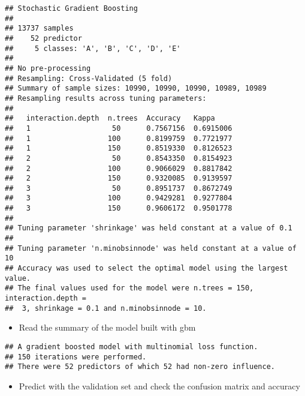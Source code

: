\documentclass[
]{article}
\newenvironment{Shaded}{\begin{snugshade}}{\end{snugshade}}
\newcommand{\AttributeTok}[1]{\textcolor[rgb]{0.13,0.29,0.53}{#1}}
\newcommand{\FunctionTok}[1]{\textcolor[rgb]{0.13,0.29,0.53}{\textbf{#1}}}
\newcommand{\NormalTok}[1]{#1}
\newcommand{\OtherTok}[1]{\textcolor[rgb]{0.56,0.35,0.01}{#1}}
\newcommand{\SpecialCharTok}[1]{\textcolor[rgb]{0.81,0.36,0.00}{\textbf{#1}}}
\providecommand{\tightlist}{%
  \setlength{\itemsep}{0pt}\setlength{\parskip}{0pt}}
\begin{document}
\begin{verbatim}
## Stochastic Gradient Boosting 
## 
## 13737 samples
##    52 predictor
##     5 classes: 'A', 'B', 'C', 'D', 'E' 
## 
## No pre-processing
## Resampling: Cross-Validated (5 fold) 
## Summary of sample sizes: 10990, 10990, 10990, 10989, 10989 
## Resampling results across tuning parameters:
## 
##   interaction.depth  n.trees  Accuracy   Kappa    
##   1                   50      0.7567156  0.6915006
##   1                  100      0.8199759  0.7721977
##   1                  150      0.8519330  0.8126523
##   2                   50      0.8543350  0.8154923
##   2                  100      0.9066029  0.8817842
##   2                  150      0.9320085  0.9139597
##   3                   50      0.8951737  0.8672749
##   3                  100      0.9429281  0.9277804
##   3                  150      0.9606172  0.9501778
## 
## Tuning parameter 'shrinkage' was held constant at a value of 0.1
## 
## Tuning parameter 'n.minobsinnode' was held constant at a value of 10
## Accuracy was used to select the optimal model using the largest value.
## The final values used for the model were n.trees = 150, interaction.depth =
##  3, shrinkage = 0.1 and n.minobsinnode = 10.
\end{verbatim}

\begin{itemize}
\tightlist
\item
  Read the summary of the model built with gbm
\end{itemize}

\begin{Shaded}
\end{Shaded}

\begin{verbatim}
## A gradient boosted model with multinomial loss function.
## 150 iterations were performed.
## There were 52 predictors of which 52 had non-zero influence.
\end{verbatim}

\begin{itemize}
\tightlist
\item
  Predict with the validation set and check the confusion matrix and
  accuracy
\end{itemize}

\begin{Shaded}
\end{Shaded}
\end{document}
